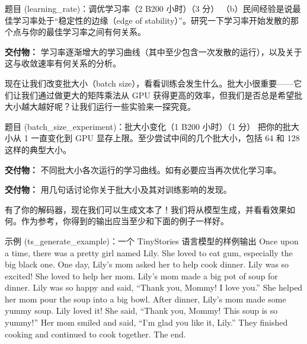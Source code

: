 \begin{problembox}{题目 (learning\_rate)：调优学习率（2 B200 小时）（3 分）}
\medskip
（b）民间经验是说最佳学习率处于“稳定性的边缘（edge of stability）”。研究一下学习率开始发散的那个点与你的最佳学习率之间有何关系。

\begin{deliverablebox}
\textbf{交付物：} 学习率逐渐增大的学习曲线（其中至少包含一次发散的运行），以及关于这与收敛速率有何关系的分析。
\end{deliverablebox}
\end{problembox}

现在让我们改变批大小（batch size），看看训练会发生什么。批大小很重要——它们让我们通过做更大的矩阵乘法从 GPU 获得更高的效率，但我们是否总是希望批大小越大越好呢？让我们运行一些实验来一探究竟。

\begin{problembox}{题目 (batch\_size\_experiment)：批大小变化（1 B200 小时）（1 分）}
把你的批大小从 1 一直变化到 GPU 显存上限。至少尝试中间的几个批大小，包括 64 和 128 这样的典型大小。

\begin{deliverablebox}
\textbf{交付物：} 不同批大小各次运行的学习曲线。如有必要应当再次优化学习率。
\end{deliverablebox}

\begin{deliverablebox}
\textbf{交付物：} 用几句话讨论你关于批大小及其对训练影响的发现。
\end{deliverablebox}
\end{problembox}

有了你的解码器，现在我们可以生成文本了！我们将从模型生成，并看看效果如何。作为参考，你得到的输出应当至少和下面的例子一样好。

\begin{problembox}{示例 (ts\_generate\_example)：一个 TinyStories 语言模型的样例输出}
Once upon a time, there was a pretty girl named Lily. She loved to eat gum, especially the big black one. One day, Lily's mom asked her to help cook dinner. Lily was so excited! She loved to help her mom. Lily's mom made a big pot of soup for dinner. Lily was so happy and said, ``Thank you, Mommy! I love you.'' She helped her mom pour the soup into a big bowl. After dinner, Lily's mom made some yummy soup. Lily loved it! She said, ``Thank you, Mommy! This soup is so yummy!'' Her mom smiled and said, ``I'm glad you like it, Lily.'' They finished cooking and continued to cook together. The end.
\end{problembox}

